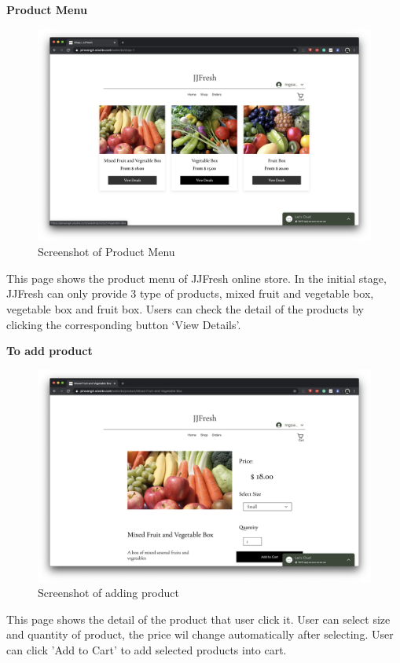 \textbf{Product Menu}
\begin{figure}[htp]
\centering
\includegraphics[width=\textwidth]{Figures/productMenu.png}
\caption{Screenshot of Product Menu }
\label{fig:productMenu}
\end{figure}


This page shows the product menu of JJFresh online store. In the initial stage, JJFresh can only provide 3 type of products, mixed fruit and vegetable box, vegetable box and fruit box. Users can check the detail of the products by clicking the corresponding button ‘View Details’.


\clearpage
\textbf{To add product}
\begin{figure}[htp]
\centering
\includegraphics[width=\textwidth]{Figures/addProduct.png}
\caption{Screenshot of adding product}
\label{fig:addProduct}
\end{figure}

This page shows the detail of the product that user click it. User can select size and quantity of product, the price wil change automatically after selecting. User can click 'Add to Cart' to add selected products into cart.


